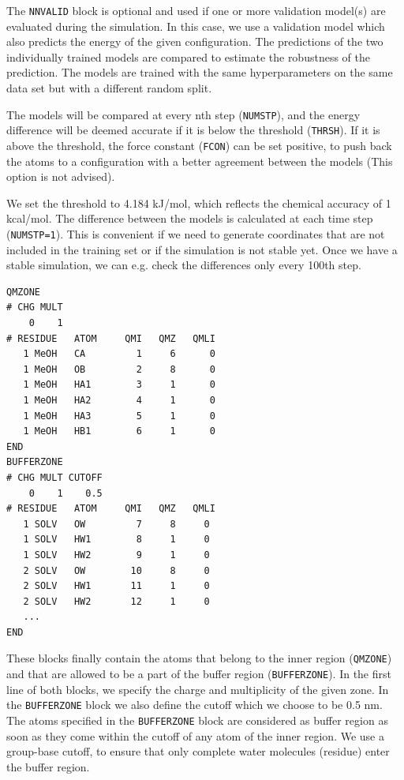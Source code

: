 The \texttt{NNVALID} block is optional and used if one or more validation model(s) are evaluated during the simulation. In this case, we use a validation model which also predicts the energy of the given configuration. The predictions of the two individually trained models are compared to estimate the robustness of the prediction. The models are trained with the same hyperparameters on the same data set but with a different random split.

The models will be compared at every nth step (\texttt{NUMSTP}), and the energy difference will be deemed accurate if it is below the threshold (\texttt{THRSH}). If it is above the threshold, the force constant (\texttt{FCON}) can be set positive, to push back the atoms to a configuration with a better agreement between the models (This option is not advised). 

We set the threshold to 4.184 kJ/mol, which reflects the chemical accuracy of 1 kcal/mol. The difference between the models is calculated at each time step (\texttt{NUMSTP=1}). This is convenient if we need to generate coordinates that are not included in the training set or if the simulation is not stable yet. Once we have a stable simulation, we can e.g. check the differences only every 100th step.

\begin{lstlisting}[breaklines=true, breakatwhitespace=false]
QMZONE
# CHG MULT
    0    1
# RESIDUE   ATOM     QMI   QMZ   QMLI
   1 MeOH   CA         1     6      0
   1 MeOH   OB         2     8      0
   1 MeOH   HA1        3     1      0
   1 MeOH   HA2        4     1      0
   1 MeOH   HA3        5     1      0
   1 MeOH   HB1        6     1      0
END
BUFFERZONE
# CHG MULT CUTOFF 
    0    1    0.5
# RESIDUE   ATOM     QMI   QMZ   QMLI
   1 SOLV   OW         7     8     0
   1 SOLV   HW1        8     1     0
   1 SOLV   HW2        9     1     0
   2 SOLV   OW        10     8     0
   2 SOLV   HW1       11     1     0
   2 SOLV   HW2       12     1     0
   ...
END
\end{lstlisting}


These blocks finally contain the atoms that belong to the inner region (\texttt{QMZONE}) and that are allowed to be a part of the buffer region (\texttt{BUFFERZONE}). In the first line of both blocks, we specify the charge and multiplicity of the given zone. In the \texttt{BUFFERZONE} block we also define the cutoff which we choose to be 0.5 nm. The atoms specified in the \texttt{BUFFERZONE} block are considered as buffer region as soon as they come within the cutoff of any atom of the inner region. We use a group-base cutoff, to ensure that only complete water molecules (residue) enter the buffer region.

